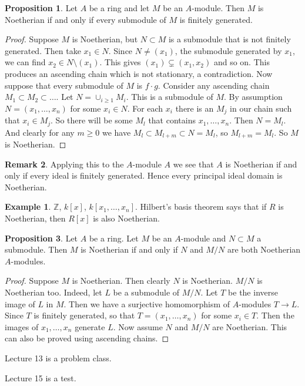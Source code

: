 \documentclass{article}
\newcommand{\Z}{\mathbb{Z}}
\newcommand{\rb}[1]{\left( #1 \right)}
\renewcommand{\sb}[1]{\left[ #1 \right]}
\theoremstyle{definition}\newtheorem{definition}{Definition}[section]
\theoremstyle{definition}\newtheorem{remark}[definition]{Remark}
\theoremstyle{definition}\newtheorem*{example}{Example}
\theoremstyle{definition}\newtheorem*{note}{Note}
\newtheorem{proposition}[definition]{Proposition}
\begin{document}
\begin{proposition}
Let $ A $ be a ring and let $ M $ be an $ A $-module. Then $ M $ is Noetherian if and only if every submodule of $ M $ is finitely generated.
\end{proposition}

\begin{proof}
Suppose $ M $ is Noetherian, but $ N \subset M $ is a submodule that is not finitely generated. Then take $ x_1 \in N $. Since $ N \ne \rb{x_1} $, the submodule generated by $ x_1 $, we can find $ x_2 \in N \setminus \rb{x_1} $. This gives $ \rb{x_1} \subsetneq \rb{x_1, x_2} $ and so on. This produces an ascending chain which is not stationary, a contradiction. Now suppose that every submodule of $ M $ is $ f \cdot g $. Consider any ascending chain $ M_1 \subset M_2 \subset \dots $. Let $ N = \cup_{i \ge 1} M_i $. This is a submodule of $ M $. By assumption $ N = \rb{x_1, \dots, x_n} $ for some $ x_i \in N $. For each $ x_i $ there is an $ M_j $ in our chain such that $ x_i \in M_j $. So there will be some $ M_l $ that contains $ x_1, \dots, x_n $. Then $ N = M_l $. And clearly for any $ m \ge 0 $ we have $ M_l \subset M_{l + m} \subset N = M_l $, so $ M_{l + m} = M_l $. So $ M $ is Noetherian.
\end{proof}

\begin{remark}
Applying this to the $ A $-module $ A $ we see that $ A $ is Noetherian if and only if every ideal is finitely generated. Hence every principal ideal domain is Noetherian.
\end{remark}

\begin{example}
$ \Z $, $ k\sb{x} $, $ k\sb{x_1, \dots, x_n} $. Hilbert's basis theorem says that if $ R $ is Noetherian, then $ R\sb{x} $ is also Noetherian.
\end{example}

\begin{proposition}
Let $ A $ be a ring. Let $ M $ be an $ A $-module and $ N \subset M $ a submodule. Then $ M $ is Noetherian if and only if $ N $ and $ M / N $ are both Noetherian $ A $-modules.
\end{proposition}

\begin{proof}
Suppose $ M $ is Noetherian. Then clearly $ N $ is Noetherian. $ M / N $ is Noetherian too. Indeed, let $ L $ be a submodule of $ M / N $. Let $ T $ be the inverse image of $ L $ in $ M $. Then we have a surjective homomorphism of $ A $-modules $ T \to L $. Since $ T $ is finitely generated, so that $ T = \rb{x_1, \dots, x_n} $ for some $ x_i \in T $. Then the images of $ x_1, \dots, x_n $ generate $ L $. Now assume $ N $ and $ M / N $ are Noetherian. This can also be proved using ascending chains.
\end{proof}


Lecture 13 is a problem class.



Lecture 15 is a test.
\end{document}
